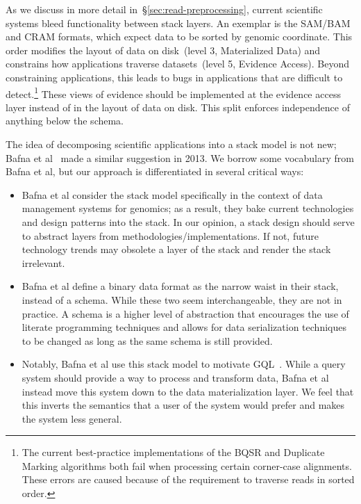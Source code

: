 \documentclass[masters]{ucbthesis}
\begin{document}
As we discuss in more detail in~\S\ref{sec:read-preprocessing}, current scientific systems bleed
functionality between stack layers. An exemplar is the SAM/BAM and CRAM formats, which expect data
to be sorted by genomic coordinate. This order modifies the layout of data on disk~(level 3, Materialized Data)
and constrains how applications traverse datasets~(level 5, Evidence Access). Beyond
constraining applications, this leads to bugs in applications that are difficult to detect.\footnote{The
current best-practice implementations of the BQSR and Duplicate Marking algorithms both fail when
processing certain corner-case alignments. These errors are caused because of the requirement to
traverse reads in sorted order.} These views of evidence should be implemented at the evidence
access layer instead of in the layout of data on disk. This split enforces independence of anything below the
schema.

The idea of decomposing scientific applications into a stack model is not new; Bafna et al~\cite{bafna13}
made a similar suggestion in 2013. We borrow some vocabulary from Bafna et al, but our approach is
differentiated in several critical ways:

\begin{itemize}
\item Bafna et al consider the stack model specifically in the context of data management systems for
genomics; as a result, they bake current technologies and design patterns into the stack. In our opinion,
a stack design should serve to abstract layers from methodologies/implementations. If not, future
technology trends may obsolete a layer of the stack and render the stack irrelevant.
\item Bafna et al define a binary data format as the narrow waist in their stack, instead of a schema.
While these two seem interchangeable, they are not in practice. A schema is a higher level of abstraction
that encourages the use of literate programming techniques and allows for data serialization techniques
to be changed as long as the same schema is still provided.
\item Notably, Bafna et al use this stack model to motivate GQL~\cite{kozanitis14}. While a query system
should provide a way to process and transform data, Bafna et al instead move this system down to the
data materialization layer. We feel that this inverts the semantics that a user of the system would prefer
and makes the system less general.
\end{itemize}
\end{document}
